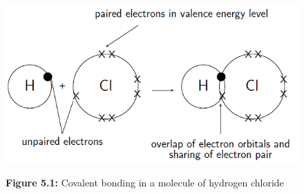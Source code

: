 {\begin{mdframed}[linewidth=4, leftmargin=40, rightmargin=40]
\begin{exercise}
\begin{enumerate}[noitemsep, label=\textbf{Step} \textbf{\arabic*}. ]
    \setcounter{subfigure}{0}


	\begin{figure}[H] %
    \begin{center}
    \label{m38704*uid7!!!underscore!!!media}\label{m38704*uid7!!!underscore!!!printimage}\includegraphics{col11305.imgs/m38704_CG11C1_003.png} %
        
      \vspace{2pt}
    \vspace{\rubberspace}\par \begin{cnxcaption}
	  \small \textbf{Figure 5.1: }Covalent bonding in a molecule of hydrogen chloride
	\end{cnxcaption}
      
    \vspace{.1in}
    
    \end{center}

 \end{figure}   

    \addtocounter{footnote}{-0}
    
        
        \end{enumerate}
         

    \end{exercise}
    \end{mdframed}
    }
    \noindent
  
\par
            \label{m38704*secfhsst!!!underscore!!!id119}\vspace{.5cm} 
      
